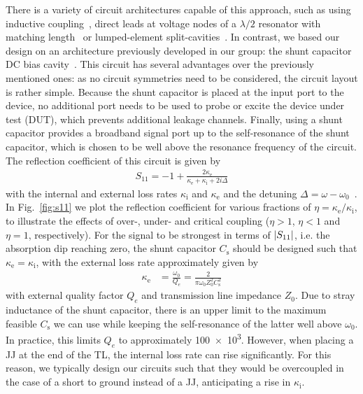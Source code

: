 There is a variety of circuit architectures capable of this approach, such as using inductive coupling~\cite{vissersFrequencytunableSuperconductingResonators2015b}, direct leads at voltage nodes of a $\lambda/2$ resonator with matching length~\cite{chenIntroductionDcBias2011a,liApplyingDirectCurrent2013} or lumped-element split-cavities~\cite{mahashabdeFastTunableHigh2020}.
%
In contrast, we based our design on an architecture previously developed in our group: the shunt capacitor DC bias cavity~\cite{bosmanBroadbandArchitectureGalvanically2015c}.
%
This circuit has several advantages over the previously mentioned ones:
%
as no circuit symmetries need to be considered, the circuit layout is rather simple.
%
Because the shunt capacitor is placed at the input port to the device, no additional port needs to be used to probe or excite the device under test (DUT), which prevents additional leakage channels.
%
Finally, using a shunt capacitor provides a broadband signal port up to the self-resonance of the shunt capacitor, which is chosen to be well above the resonance frequency of the circuit.
%
The reflection coefficient of this circuit is given by
%
\begin{align}
S_{11}=-1+\frac{2\kappa_\text{e}}{\kappa_\text{e}+\kappa_\text{i}+2i\Delta}
\label{eq:intro-s11}
\end{align}
%
with the internal and external loss rates $\kappa_\text{i}$ and $\kappa_\text{e}$ and the detuning $\Delta=\omega-\omega_0$~\cite{bosmanBroadbandArchitectureGalvanically2015c}.
%
In Fig.~\ref{fig:s11} we plot the reflection coefficient for various fractions of $\eta =\kappa_\text{e}/\kappa_\text{i}$, to illustrate the effects of over-, under- and critical coupling ($\eta >1$, $\eta <1$ and $\eta =1$, respectively).
%
For the signal to be strongest in terms of $\lvert S_{11}\rvert$, i.e. the absorption dip reaching zero, the shunt capacitor $C_\text{s}$ should be designed such that $\kappa_\text{e}=\kappa_\text{i}$, with the external loss rate approximately given by
%
\begin{align}
\kappa_\text{e} &= \frac{\omega_0}{Q_e} = \frac{2}{\pi\omega_0Z_0^2C_\text{s}^2}
\label{eq:intro-kappae}
\end{align}
%
with external quality factor $Q_e$ and transmission line impedance $Z_0$.
%
Due to stray inductance of the shunt capacitor, there is an upper limit to the maximum feasible $C_\text{s}$ we can use while keeping the self-resonance of the latter well above $\omega_0$.
%
In practice, this limits $Q_e$ to approximately \num{100e3}.
%
However, when placing a JJ at the end of the TL, the internal loss rate can rise significantly.
%
For this reason, we typically design our circuits such that they would be overcoupled in the case of a short to ground instead of a JJ, anticipating a rise in $\kappa_\text{i}$.


